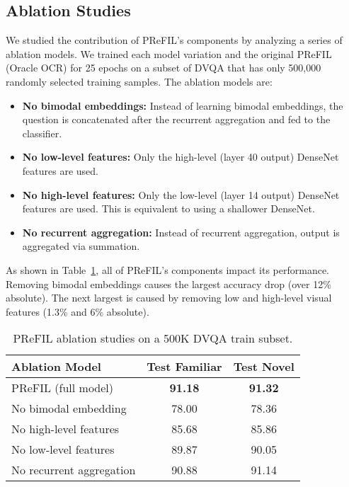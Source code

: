 \documentclass[10pt,twocolumn]{article}
\begin{document}
\subsection{Ablation Studies}
\label{sec:ablation}
We studied the contribution of PReFIL's components by analyzing  a series of ablation models. We trained each model variation and the original PReFIL (Oracle OCR) for 25 epochs on a subset of DVQA that has only 500,000 randomly selected training samples. The ablation models  are:
\begin{itemize}[noitemsep,nolistsep]
\item \textbf{No bimodal embeddings:} Instead of learning bimodal embeddings, the question is concatenated after the recurrent aggregation and fed to the classifier.
    \item \textbf{No low-level features:} Only the high-level (layer 40 output) DenseNet features are used.
    \item \textbf{No high-level features:} Only the low-level (layer 14 output) DenseNet features are used. This is equivalent to using a shallower DenseNet.
    \item \textbf{No recurrent aggregation: } Instead of recurrent aggregation, output is aggregated via summation.
\end{itemize}

As shown in Table~\ref{tab:ablation}, all of PReFIL's components impact its performance. Removing bimodal embeddings causes the largest accuracy drop (over 12\% absolute). The next largest is caused by removing low and high-level visual features (1.3\% and 6\% absolute). 

\begin{table}
\centering
\footnotesize
\caption{PReFIL ablation studies on a 500K DVQA train subset. \label{tab:ablation}}
\vspace{3pt}
\begin{tabular}{lcc}
\toprule
Ablation Model         & Test Familiar & Test Novel \\ \midrule
PReFIL (full model) & \textbf{91.18}          & \textbf{91.32}           \\
No bimodal embedding       &      78.00         &  78.36         \\
No high-level features & 85.68              & 85.86            \\
No low-level features & 89.87              & 90.05            \\
No recurrent aggregation   & 90.88             &    91.14        \\ \midrule
\end{tabular}
\end{table}
\end{document}
